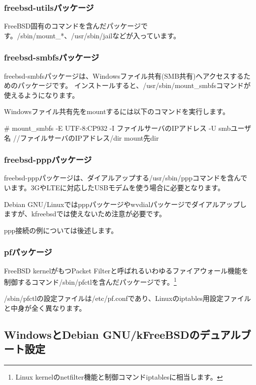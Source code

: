 \documentclass[mingoth,a4paper]{jsarticle}
\begin{document}
\subsubsection{freebsd-utilsパッケージ}

FreeBSD固有のコマンドを含んだパッケージです。/sbin/mount\_*、/usr/sbin/jailなどが入っています。

\subsubsection{freebsd-smbfsパッケージ}

freebsd-smbfsパッケージは、Windowsファイル共有(SMB共有)へアクセスするためのパッケージです。
インストールすると、/usr/sbin/mount\_smbfsコマンドが使えるようになります。

Windowsファイル共有先をmountするには以下のコマンドを実行します。

\begin{commandline}
# mount_smbfs -E UTF-8:CP932 -I {ファイルサーバのIPアドレス} -U {smbユーザ名} //{ファイルサーバのIPアドレス}/{dir} {mount先dir}
\end{commandline}

\subsubsection{freebsd-pppパッケージ}

freebsd-pppパッケージは、ダイアルアップする/usr/sbin/pppコマンドを含んでいます。3GやLTEに対応したUSBモデムを使う場合に必要となります。

Debian GNU/Linuxではpppパッケージやwvdialパッケージでダイアルアップしますが、kfreebsdでは使えないため注意が必要です。

ppp接続の例については後述します。

\subsubsection{pfパッケージ}

FreeBSD kernelがもつPacket Filterと呼ばれるいわゆるファイアウォール機能を制御するコマンド/sbin/pfctlを含んだパッケージです。\footnote{Linux kernelのnetfilter機能と制御コマンドiptablesに相当します。}

/sbin/pfctlの設定ファイルは/etc/pf.confであり、Linuxのiptables用設定ファイルと中身が全く異なります。

\subsection{WindowsとDebian GNU/kFreeBSDのデュアルブート設定}
\end{document}

